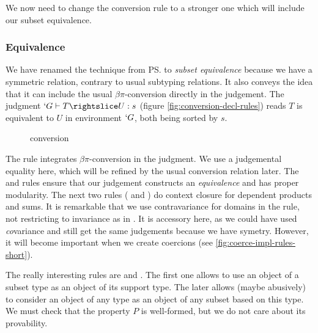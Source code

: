 \documentclass{llncs}
\begin{document}
We now need to change the conversion rule to a stronger one which will
include our subset equivalence.

\subsubsection{Equivalence}
We have renamed the technique from \ps{} to 
\emph{subset equivalence} because we have a symmetric relation, contrary
to usual subtyping relations. It also conveys the idea that it can
include the usual $\beta\pi$-conversion directly in the judgement.
The judgment $`G \typed T \subd{} U : s$ (figure
\vref{fig:conversion-decl-rules}) reads $T$ is equivalent to $U$ in
environment $`G$, both being sorted by $s$. 

\begin{figure}[h]
  \subtdRules
  \caption{\Russell{} conversion}
  \label{fig:conversion-decl-rules}
\end{figure}

The rule  integrates $\beta\pi$-conversion in the
judgment. We use a judgemental equality here, which will be refined by
the usual conversion relation later. The  and
 rules ensure that our judgement constructs an \emph{equivalence} and has
proper modularity. The next two rules ( and
) do context closure for dependent
products and sums. It is remarkable that we use contravariance for
domains in the  rule, not restricting to invariance as in
\PVS. It is accessory here, as we could have used \emph{co}variance and
still get the same judgements because we have symetry. However, it will
become important when we create coercions (see
\vref{fig:coerce-impl-rules-short}).

The really interesting rules are  and
. The first one allows to use an object of a subset type
as an object of its support type. The later allows (maybe abusively) to
consider an object of any type as an object of any subset based on
this type. We must check that the property $P$ is well-formed, but
we do not care about its provability.
\end{document}
